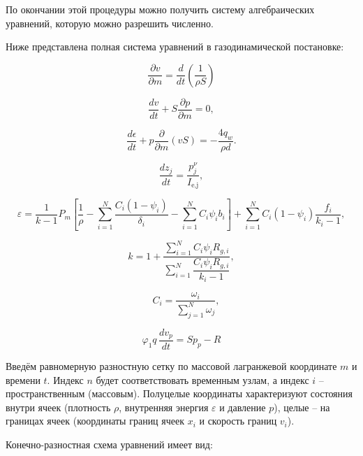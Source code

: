 \documentclass[14pt, a4paper]{report} %
\begin{document}
По окончании этой процедуры можно получить систему алгебраических уравнений, которую можно разрешить численно.

Ниже представлена полная система уравнений в газодинамической постановке: 

\begin{equation}
\frac{\partial v}{\partial m} = \frac{d}{dt}\left(\frac{1}{\rho S}\right)
\end{equation}

\begin{equation}
\frac{dv}{dt} + S\frac{\partial p}{\partial m} = 0,
\end{equation}

\begin{equation}
\frac{d\epsilon}{dt} + p\frac{\partial}{\partial m}(vS) = -\frac{4q_w}{\rho d}.
\end{equation}

\begin{equation}
\frac{dz_j}{dt} = \frac{p^\nu_j}{I_{\text{e,j}}}, 
\end{equation}

\begin{equation}
\varepsilon = \frac{1}{k-1} P_m \left[ \frac{1}{\rho} - \sum_{i=1}^N \frac{C_i (1 - \psi_i)}{\delta_i} - \sum_{i=1}^N C_i \psi_i b_i \right] + \sum_{i=1}^N C_i (1 - \psi_i) \frac{f_i}{k_i - 1}, 
\end{equation}

\begin{equation}
k = 1 + \frac{\sum_{i=1}^N C_i \psi_i R_{g,i}}{\sum_{i=1}^N \dfrac{C_i \psi_i R_{g,i}}{k_i - 1}},
\end{equation}

\begin{equation}
\quad C_i = \frac{\omega_i}{\sum_{j=1}^N \omega_j},
\end{equation}

\begin{equation}
\varphi_1 q \, \dfrac{d v_{p}}{d t} = S p_{p} - R
\end{equation}


Введём равномерную разностную сетку по массовой лагранжевой координате $m$ и времени $t$. Индекс $n$ будет соответствовать временным узлам, а индекс $i$ -- пространственным (массовым). Полуцелые координаты характеризуют состояния внутри ячеек (плотность $\rho$, внутренняя энергия $\varepsilon$ и давление $p$), целые -- на границах ячеек (координаты границ ячеек $x_i$ и скорость границ $v_i$).

Конечно-разностная схема уравнений имеет вид: 
\end{document}

